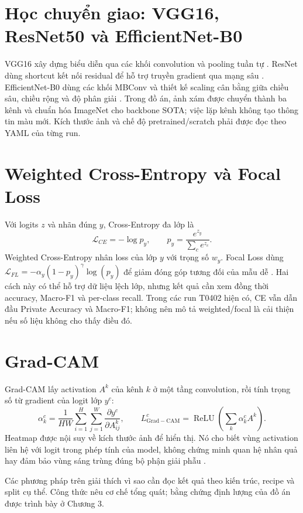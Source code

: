 \section{Học chuyển giao: VGG16, ResNet50 và EfficientNet-B0}
VGG16 xây dựng biểu diễn qua các khối convolution và pooling tuần tự \citep{simonyan2014vgg}. ResNet dùng shortcut kết nối residual để hỗ trợ truyền gradient qua mạng sâu \citep{he2016resnet}. EfficientNet-B0 dùng các khối MBConv và thiết kế scaling cân bằng giữa chiều sâu, chiều rộng và độ phân giải \citep{tan2019efficientnet}. Trong đồ án, ảnh xám được chuyển thành ba kênh và chuẩn hóa ImageNet cho backbone SOTA; việc lặp kênh không tạo thông tin màu mới. Kích thước ảnh và chế độ pretrained/scratch phải được đọc theo YAML của từng run.

\section{Weighted Cross-Entropy và Focal Loss}
Với logits $z$ và nhãn đúng $y$, Cross-Entropy đa lớp là
\begin{equation}
\mathcal{L}_{CE}=-\log p_y,\qquad p_y=\frac{e^{z_y}}{\sum_c e^{z_c}}.
\end{equation}
Weighted Cross-Entropy nhân loss của lớp $y$ với trọng số $w_y$. Focal Loss dùng $\mathcal{L}_{FL}=-\alpha_y(1-p_y)^\gamma\log(p_y)$ để giảm đóng góp tương đối của mẫu dễ \citep{lin2017focal}. Hai cách này có thể hỗ trợ dữ liệu lệch lớp, nhưng kết quả cần xem đồng thời accuracy, Macro-F1 và per-class recall. Trong các run T0402 hiện có, CE vẫn dẫn đầu Private Accuracy và Macro-F1; không nên mô tả weighted/focal là cải thiện nếu số liệu không cho thấy điều đó.

\section{Grad-CAM}
Grad-CAM lấy activation $A^k$ của kênh $k$ ở một tầng convolution, rồi tính trọng số từ gradient của logit lớp $y^c$:
\begin{equation}
\alpha_k^c=\frac{1}{HW}\sum_{i=1}^{H}\sum_{j=1}^{W}\frac{\partial y^c}{\partial A_{ij}^{k}},\qquad
L_{\mathrm{Grad-CAM}}^c=\operatorname{ReLU}\left(\sum_k\alpha_k^c A^k\right).
\end{equation}
Heatmap được nội suy về kích thước ảnh để hiển thị. Nó cho biết vùng activation liên hệ với logit trong phép tính của model, không chứng minh quan hệ nhân quả hay đảm bảo vùng sáng trùng đúng bộ phận giải phẫu \citep{selvaraju2017gradcam}.

\begin{calloutbox}
Các phương pháp trên giải thích vì sao cần đọc kết quả theo kiến trúc, recipe và split cụ thể. Công thức nêu cơ chế tổng quát; bằng chứng định lượng của đồ án được trình bày ở Chương 3.
\end{calloutbox}
